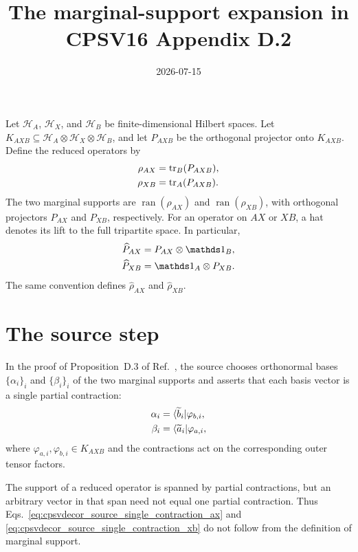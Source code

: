 \documentclass{article}
\title{The marginal-support expansion in CPSV16 Appendix D.2}
\author{}
\date{2026-07-15}
\begin{document}
\maketitle
{}

Let $\mathcal H_A$, $\mathcal H_X$, and $\mathcal H_B$ be finite-dimensional
Hilbert spaces. Let
$K_{AXB}\subseteq\mathcal H_A\otimes\mathcal H_X\otimes\mathcal H_B$, and let
$P_{AXB}$ be the orthogonal projector onto $K_{AXB}$. Define the reduced
operators by
\begin{align}
    \rho_{AX}
        &= \operatorname{tr}_B(P_{AXB}),
    \label{eq:cpsvdecor_reduced_operator_ax}\\
    \rho_{XB}
        &= \operatorname{tr}_A(P_{AXB}).
    \label{eq:cpsvdecor_reduced_operator_xb}
\end{align}
The two marginal supports are $\operatorname{ran}(\rho_{AX})$ and
$\operatorname{ran}(\rho_{XB})$, with orthogonal projectors $P_{AX}$ and
$P_{XB}$, respectively. For an operator on $AX$ or $XB$, a hat denotes its
lift to the full tripartite space. In particular,
\begin{align}
    \widehat P_{AX}
        &= P_{AX}\otimes\Id_B,
    \label{eq:cpsvdecor_lifted_projector_ax}\\
    \widehat P_{XB}
        &= \Id_A\otimes P_{XB}.
    \label{eq:cpsvdecor_lifted_projector_xb}
\end{align}
The same convention defines $\widehat\rho_{AX}$ and
$\widehat\rho_{XB}$.

\section{The source step}

In the proof of Proposition~D.3 of
Ref.~\cite[lines 2236--2242]{Cirac2016MPDO_arXiv}, the source chooses
orthonormal bases $\{\alpha_i\}_i$ and $\{\beta_i\}_i$ of the two marginal
supports and asserts that each basis vector is a single partial contraction:
\begin{align}
    \alpha_i
        &= \langle \widetilde b_i|\varphi_{b,i},
    \label{eq:cpsvdecor_source_single_contraction_ax}\\
    \beta_i
        &= \langle \widetilde a_i|\varphi_{a,i},
    \label{eq:cpsvdecor_source_single_contraction_xb}
\end{align}
where $\varphi_{a,i},\varphi_{b,i}\in K_{AXB}$ and the contractions act on the
corresponding outer tensor factors.

The support of a reduced operator is spanned by partial contractions, but an
arbitrary vector in that span need not equal one partial contraction. Thus
Eqs.~\ref{eq:cpsvdecor_source_single_contraction_ax} and
\ref{eq:cpsvdecor_source_single_contraction_xb} do not follow from the
definition of marginal support.
\end{document}
